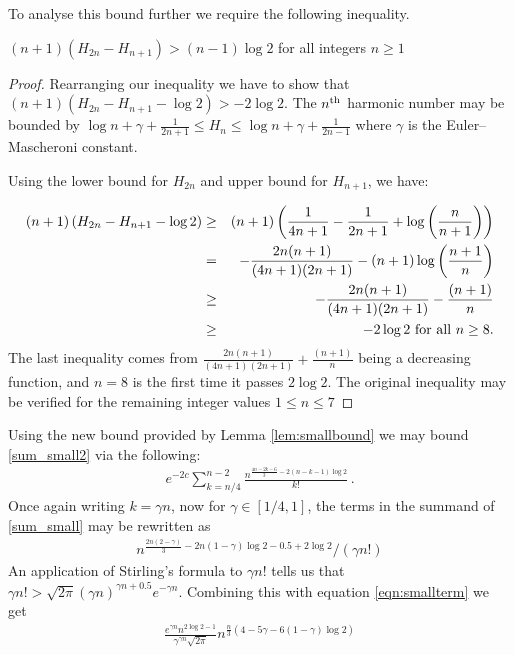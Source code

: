 \documentclass[11pt]{report}
\begin{document}
To analyse this bound further we require the following inequality.
\begin{lemma}
	\label{lem:smallbound}
	$(n+1)\left(H_{2n} -H_{n+1}\right) > (n-1)\log 2$ for all integers $n\geq 1$ 
\end{lemma}
\begin{proof}
	Rearranging our inequality we have to show that
	$(n+1)\left(H_{2n} -H_{n+1} - \log 2\right) > -2 \log 2$.
	The $n^{\textnormal{th}}$ harmonic number may be bounded by $\log n + 
	\gamma + \frac{1}{2n+1} \leq H_{n} \leq \log n 
	+\gamma + \frac{1}{2n-1}$ where $\gamma$ is the Euler–Mascheroni constant.
	
	Using the lower bound for $H_{2n}$ and upper 
	bound for $H_{n+1}$, we have:
	
	
	
	
	
	
	
	
	
	
	
	\begin{eqnarray*}
		(n+1)\left(H_{2n} -H_{n+1} - \log 2\right) & \geq &
		(n+1) \left( \frac{1}{4n+1} - \frac{1}{2n+1} 
		+\log\left(\frac{n}{n+1}\right)\right)\\
		& = &  -\frac{2n(n+1)}{(4n+1)(2n+1)}  -(n+1)\log\left(\frac{n+1}{n}\right) \\
		& \geq & -\frac{2n(n+1)}{(4n+1)(2n+1)} -\frac{(n+1)}{n} \\
		& \geq & -2 \log 2 \textnormal{ for all } n\geq 8.
	\end{eqnarray*}
	The last inequality comes from $\frac{2n(n+1)}{(4n+1)(2n+1)} +\frac{(n+1)}{n}$ being a decreasing function, and $n=8$ is the first time it passes $2\log 2$.	The original inequality may be verified for the remaining integer values $1 \leq n \leq 7 $ 
\end{proof}


Using the new bound provided by Lemma \ref{lem:smallbound} we may bound 
\eqref{sum_small2} via the following:
\begin{eqnarray}
e^{-2c}\sum_{k =n/4}^{n-2} 
\frac{n^{\frac{4n-2k-6}{3}-2(n-k-1)\log 2}}{k!}\,. 
\label{sum_small}
\end{eqnarray}
Once again writing $k=\gamma n$, now for $\gamma\in[1/4,1]$, the terms in 
the summand of \eqref{sum_small} may be rewritten as
\begin{eqnarray} n^{\frac{2n(2-\gamma)}{3}-2n(1-\gamma)\log 2 - 0.5 +2\log 
	2} /(\gamma n!) \label{eqn:smallterm}
\end{eqnarray}
An application of Stirling's formula to $\gamma n!$ tells us that
$\gamma n! > \sqrt{2\pi} (\gamma n)^{\gamma n +0.5} e^{-\gamma n}$.
Combining this with equation \eqref{eqn:smallterm} we get
\begin{eqnarray}
\frac{e^{\gamma n} n^{2\log 2 -1}}{\gamma^{\gamma 
		n}\sqrt{2\pi}}n^{\frac{n}{3}\left( 4 -5\gamma -6(1-\gamma)\log 2 \right)} 
\label{eqn:smallterm2}
\end{eqnarray}
\end{document}
